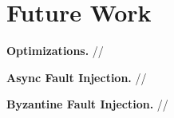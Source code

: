 
\section{Future Work} \label{fw}

\textbf{Optimizations.} //

\textbf{Async Fault Injection.} //

\textbf{Byzantine Fault Injection.} //

